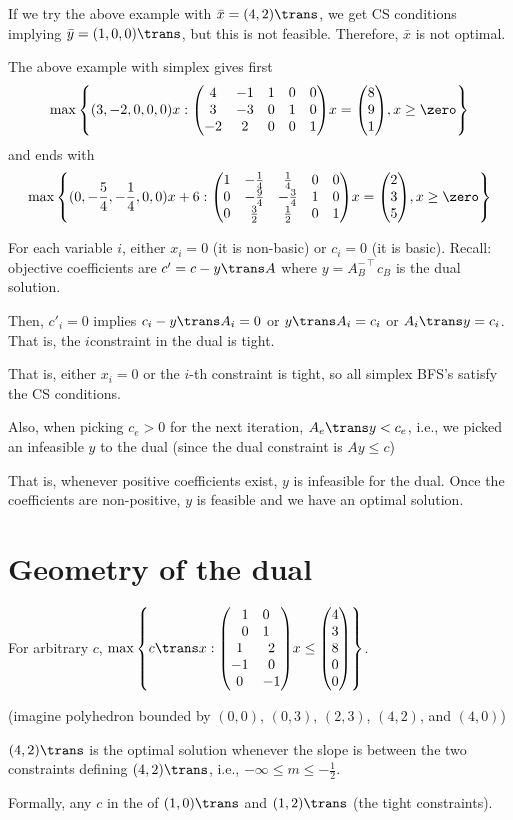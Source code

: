 If we try the above example with $\bar x = (4,2)\trans$, we get CS
conditions implying $\bar y = (1,0,0)\trans$, but this is not feasible.
Therefore, $\bar x$ is not optimal.

The above example with simplex gives first
\[ \max\qty{(3,-2,0,0,0)x : \mqty(\mqty{4&-1\\3&-3\\-2&2}&\mqty{\imat{3}})x=\mqty(8\\9\\1), x \geq \zero} \]
and ends with
\[ \max\qty{(0,-\frac54,-\frac14,0,0)x + 6 : \mqty(1&-\frac14&\frac14&0&0\\0&-\frac94&-\frac34&1&0\\0&\frac32&\frac12&0&1)x=\mqty(2\\3\\5), x \geq \zero} \]

For each variable $i$, either $x_i = 0$ (it is non-basic) or $c_i = 0$ (it is basic).
Recall: objective coefficients are $c' = c - y\trans A$ where $y = A_B^{-\intercal}c_B$ is the dual solution.

Then, $c'_i = 0$ implies $c_i - y\trans A_i = 0$ or $y\trans A_i = c_i$ or $A_i\trans y = c_i$.
That is, the $i$\xth constraint in the dual is tight.

That is, either $x_i = 0$ or the $i$-th constraint is tight,
so all simplex BFS's satisfy the CS conditions.

Also, when picking $c_e > 0$ for the next iteration,
$A_e\trans y < c_e$, i.e., we picked an infeasible $y$ to the dual
(since the dual constraint is $Ay \leq c$)

That is, whenever positive coefficients exist, $y$ is infeasible
for the dual. Once the coefficients are non-positive, $y$ is
feasible and we have an optimal solution.

\section{Geometry of the dual}

\begin{example}
  For arbitrary $c$,
  $\max\qty{c\trans x : \mqty(\mqty{\imat{2}}\\\mqty{1&2\\-1&0\\0&-1})x \leq \mqty(4\\3\\8\\0\\0)}$.
\end{example}
\begin{sol}
  (imagine polyhedron bounded by $(0,0)$, $(0,3)$, $(2,3)$, $(4,2)$, and $(4,0)$)

  $(4,2)\trans$ is the optimal solution whenever the slope is between
  the two constraints defining $(4,2)\trans$, i.e.,
  $-\infty \leq m \leq -\frac12$.

  Formally, any $c$ in the  of $(1,0)\trans$ and $(1,2)\trans$ (the tight constraints).
\end{sol}

